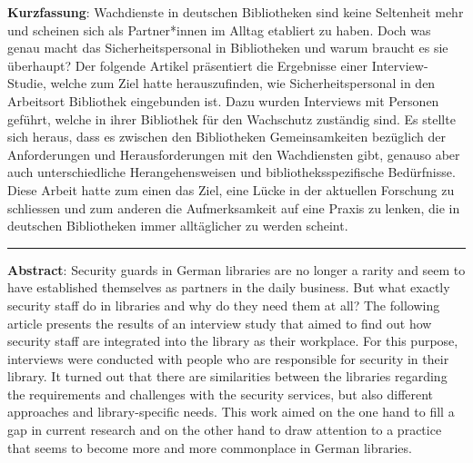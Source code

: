\textbf{Kurzfassung}: Wachdienste in deutschen Bibliotheken sind keine
Seltenheit mehr und scheinen sich als Partner*innen im Alltag etabliert
zu haben. Doch was genau macht das Sicherheitspersonal in Bibliotheken
und warum braucht es sie überhaupt? Der folgende Artikel präsentiert die
Ergebnisse einer Interview-Studie, welche zum Ziel hatte herauszufinden,
wie Sicherheitspersonal in den Arbeitsort Bibliothek eingebunden ist.
Dazu wurden Interviews mit Personen geführt, welche in ihrer Bibliothek
für den Wachschutz zuständig sind. Es stellte sich heraus, dass es
zwischen den Bibliotheken Gemeinsamkeiten bezüglich der Anforderungen
und Herausforderungen mit den Wachdiensten gibt, genauso aber auch
unterschiedliche Herangehensweisen und bibliotheksspezifische
Bedürfnisse. Diese Arbeit hatte zum einen das Ziel, eine Lücke in der
aktuellen Forschung zu schliessen und zum anderen die Aufmerksamkeit auf
eine Praxis zu lenken, die in deutschen Bibliotheken immer alltäglicher
zu werden scheint.

\begin{center}\rule{0.5\linewidth}{0.5pt}\end{center}

\textbf{Abstract}: Security guards in German libraries are no longer a
rarity and seem to have established themselves as partners in the daily
business. But what exactly security staff do in libraries and why do
they need them at all? The following article presents the results of an
interview study that aimed to find out how security staff are integrated
into the library as their workplace. For this purpose, interviews were
conducted with people who are responsible for security in their library.
It turned out that there are similarities between the libraries
regarding the requirements and challenges with the security services,
but also different approaches and library-specific needs. This work
aimed on the one hand to fill a gap in current research and on the other
hand to draw attention to a practice that seems to become more and more
commonplace in German libraries.
